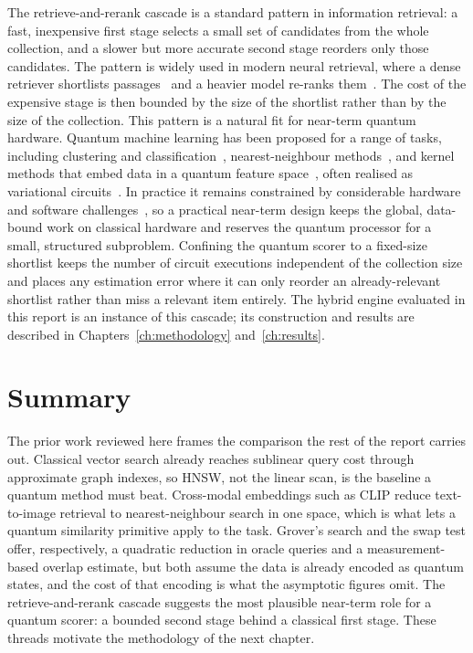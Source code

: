 The retrieve-and-rerank cascade is a standard pattern in information retrieval: a
fast, inexpensive first stage selects a small set of candidates from the whole
collection, and a slower but more accurate second stage reorders only those
candidates. The pattern is widely used in modern neural retrieval, where a dense
retriever shortlists passages~\cite{karpukhin2020dpr} and a heavier model
re-ranks them~\cite{nogueira2019passagererank}. The cost of the expensive stage
is then bounded by the size of the shortlist rather than by the size of the
collection. This pattern is a natural fit for near-term quantum hardware. Quantum
machine learning has been proposed for a range of tasks, including clustering and
classification~\cite{lloyd2013quantum,rebentrost2014qsvm}, nearest-neighbour
methods~\cite{wiebe2015nearestneighbor}, and kernel methods that embed data in a
quantum feature space~\cite{schuld2019featurehilbert,havlicek2019supervised,lloyd2020embeddings,schuld2021kernelmethods},
often realised as variational circuits~\cite{cerezo2021variational}. In practice
it remains constrained by considerable hardware and software
challenges~\cite{biamonte2017qml,wittek2014qml}, so a practical near-term design
keeps the global, data-bound work on classical hardware and reserves the quantum
processor for a small, structured subproblem.
Confining the quantum scorer to a fixed-size shortlist keeps the number of
circuit executions independent of the collection size and places any estimation
error where it can only reorder an already-relevant shortlist rather than miss a
relevant item entirely. The hybrid engine evaluated in this report is an instance
of this cascade; its construction and results are described in
Chapters~\ref{ch:methodology} and~\ref{ch:results}.

\section{Summary}
\label{sec:lit:summary}

The prior work reviewed here frames the comparison the rest of the report carries
out. Classical vector search already reaches sublinear query cost through
approximate graph indexes, so HNSW, not the linear scan, is the baseline a
quantum method must beat. Cross-modal embeddings such as CLIP reduce text-to-image
retrieval to nearest-neighbour search in one space, which is what lets a quantum
similarity primitive apply to the task. Grover's search and the swap test offer,
respectively, a quadratic reduction in oracle queries and a measurement-based
overlap estimate, but both assume the data is already encoded as quantum states,
and the cost of that encoding is what the asymptotic figures omit. The
retrieve-and-rerank cascade suggests the most plausible near-term role for a
quantum scorer: a bounded second stage behind a classical first stage. These
threads motivate the methodology of the next chapter.

